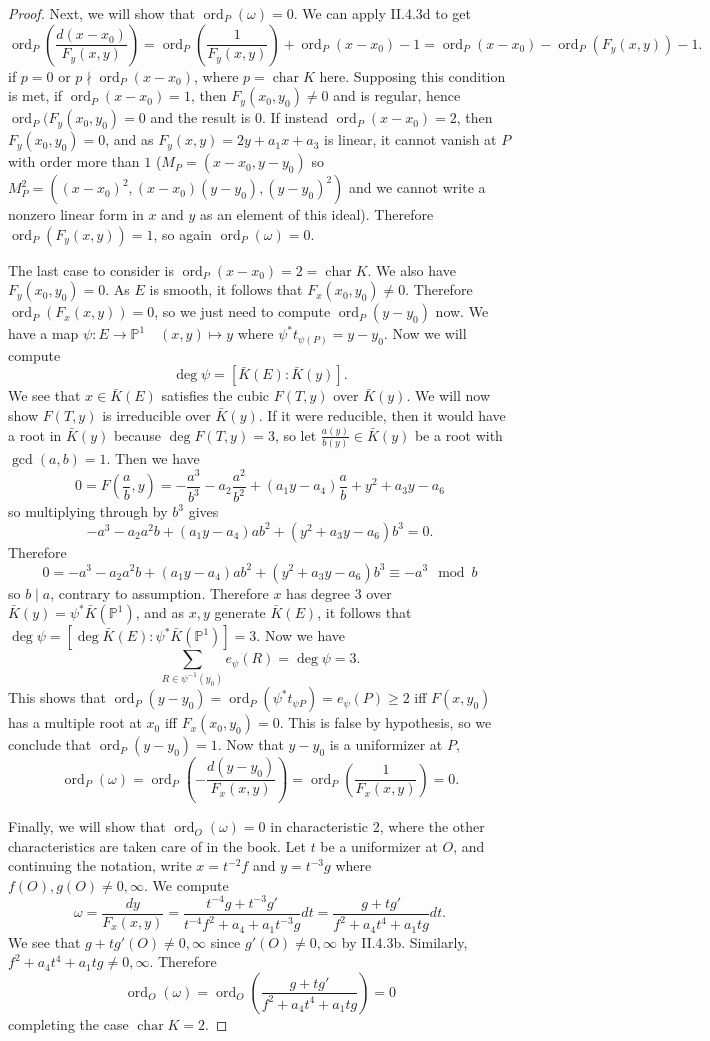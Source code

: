 \documentclass{article}
\theoremstyle{customplain}
\theoremstyle{customdef}
\renewcommand{\P}{\mathbb{P}}
\DeclareMathOperator{\ord}{ord}
\DeclareMathOperator{\Char}{\mathrm{char}}
\theoremstyle{definition} %
\renewcommand{\ge}{\geqslant}
\begin{document}
\begin{proof}
    Next, we will show that $\ord_P(\omega)=0$. We can apply II.4.3d to get 
    \[
    \ord_P(\frac{d(x-x_0)}{F_y(x,y)})=\ord_P(\frac{1}{F_y(x,y)})+\ord_P(x-x_0)-1 = \ord_P(x-x_0)-\ord_P(F_y(x,y))-1.
    \]
    if $p=0$ or $p\nmid \ord_P(x-x_0)$, where $p=\Char K$ here. Supposing this condition is met, if $\ord_P(x-x_0)=1$, then $F_y(x_0,y_0)\ne 0$ and is regular, hence $\ord_P(F_y(x_0, y_0)=0$ and the result is $0$. If instead $\ord_P(x-x_0)=2$, then $F_y(x_0, y_0)=0$, and as $F_y(x,y)=2y+a_1x+a_3$ is linear, it cannot vanish at $P$ with order more than $1$ ($M_P = (x-x_0, y-y_0)$ so $M_P^2=((x-x_0)^2, (x-x_0)(y-y_0), (y-y_0)^2)$ and we cannot write a nonzero linear form in $x$ and $y$ as an element of this ideal). Therefore $\ord_P(F_y(x,y))=1$, so again $\ord_P(\omega)=0.$

    The last case to consider is $\ord_P(x-x_0)=2=\Char K.$ We also have $F_y(x_0, y_0)=0.$ As $E$ is smooth, it follows that $F_x(x_0,y_0)\ne 0$. Therefore $\ord_P(F_x(x,y))=0$, so we just need to compute $\ord_P(y-y_0)$ now. We have a map $\psi:E \to \P^1 \quad (x,y)\mapsto y$ where $\psi^* t_{\psi(P)}=y-y_0$. Now we will compute $$\deg \psi = [\bar K(E): \bar K(y)].$$ We see that $x\in \bar K(E)$ satisfies the cubic $F(T, y)$ over $\bar K(y)$. We will now show $F(T,y)$ is irreducible over $\bar K(y).$ If it were reducible, then it would have a root in $\bar K(y)$ because $\deg F(T,y)=3$, so let $\frac{a(y)}{b(y)}\in \bar K(y)$ be a root with $\gcd(a,b)=1$. Then we have
    \[
    0=F(\frac{a}{b},y)=-\frac{a^3}{b^3}-a_2 \frac{a^2}{b^2}+(a_1y-a_4) \frac{a}{b}+y^2+a_3y-a_6
    \]
    so multiplying through by $b^3$ gives
    \[
    -a^3-a_2 a^2 b + (a_1y-a_4)ab^2+(y^2+a_3y-a_6)b^3 = 0.
    \]
    Therefore $$0=-a^3-a_2 a^2 b + (a_1y-a_4)ab^2+(y^2+a_3y-a_6)b^3\equiv -a^3 \mod b$$ so $b\mid a$, contrary to assumption. Therefore $x$ has degree 3 over $\bar K(y)=\psi^* \bar K(\P^1)$, and as $x,y$ generate $\bar K(E)$, it follows that $\deg \psi =[\deg \bar K(E):\psi^* \bar K(\P^1)]=3.$ Now we have
    \[
    \sum_{R\in \psi^{-1}(y_0)} e_\psi(R) = \deg \psi = 3.
    \]
    This shows that $\ord_P(y-y_0)=\ord_P(\psi^* t_{\psi P})=e_\psi(P)\ge 2$ iff $F(x,y_0)$ has a multiple root at $x_0$ iff $F_x(x_0,y_0)=0$. This is false by hypothesis, so we conclude that $\ord_P(y-y_0)=1.$ Now that $y-y_0$ is a uniformizer at $P$,
    \[
    \ord_P(\omega) = \ord_P(-\frac{d(y-y_0)}{F_x(x,y)})=\ord_P(\frac{1}{F_x(x,y)})=0.
    \]

    Finally, we will show that $\ord_O(\omega)=0$ in characteristic 2, where the other characteristics are taken care of in the book. Let $t$ be a uniformizer at $O$, and continuing the notation, write $x=t^{-2}f$ and $y=t^{-3}g$ where $f(O),g(O)\ne 0,\infty.$ We compute
    \[
    \omega = \frac{dy}{F_x(x,y)} = \frac{t^{-4}g+t^{-3}g'}{t^{-4}f^2+a_4+a_1t^{-3}g}dt = \frac{g+tg'}{f^2+a_4t^4+a_1 t g} dt.
    \]
    We see that $g+tg'(O)\ne 0,\infty$ since $g'(O)\ne 0, \infty$ by II.4.3b. Similarly, $f^2+a_4t^4+a_1tg\ne 0, \infty$. Therefore 
    \[
    \ord_O(\omega)=\ord_O(\frac{g+tg'}{f^2+a_4t^4+a_1tg})=0
    \]
    completing the case $\Char K = 2.$
\end{proof}
\end{document}
